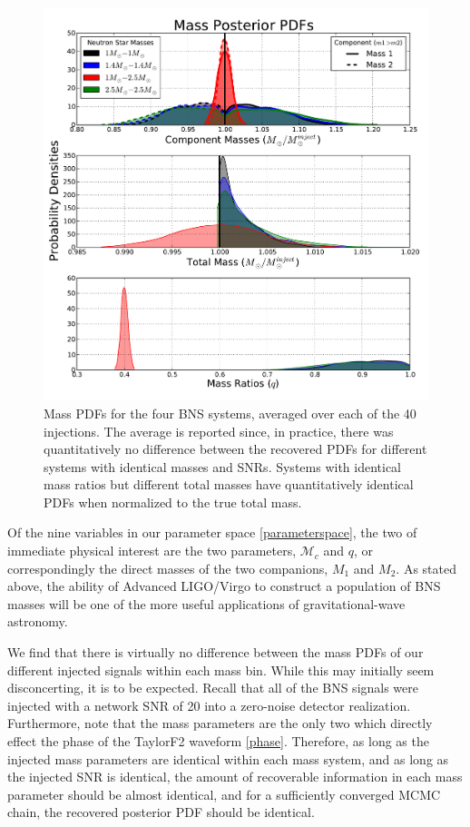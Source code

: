 \documentclass[11pt,a4paper]{emulateapj}
\newcommand{\chmass}{\mathcal{M}_c}
\begin{document}
\begin{figure}[ht!]
  \centering
 \includegraphics[trim=2cm 0cm 2cm 0cm, clip=false,scale=0.7]{newMasses.pdf}
 \caption{Mass PDFs for the four BNS systems, averaged over each of the 40 injections.  The average is reported since, in practice, there was quantitatively no difference between the recovered PDFs for different systems with identical masses and SNRs.  Systems with identical mass ratios but different total masses have quantitatively identical PDFs when normalized to the true total mass.}
  \label{metaMassPDFs}
\end{figure}

Of the nine variables in our parameter space \eqref{parameterspace}, the two of immediate physical
interest are the two parameters, $\chmass$ and $q$, or correspondingly the direct masses 
of the two companions, $M_1$ and $M_2$.    As stated above, the ability of
Advanced LIGO/Virgo to construct a population of BNS masses will be one of the more useful applications
of gravitational-wave astronomy.

We find that there is virtually no difference between the mass PDFs of our different injected signals
within each mass bin.  While this may initially seem disconcerting, it is to be expected.  Recall that all of the BNS signals were injected with a network SNR of 20 into a zero-noise detector realization.  Furthermore, note that the mass parameters are the only two which directly effect the phase of the TaylorF2 waveform \eqref{phase}.  Therefore, as long as the injected mass parameters are identical within each mass system, and as long as the injected SNR is identical, the amount of recoverable information in each mass parameter should be almost identical, and for a sufficiently converged MCMC chain, the recovered posterior PDF should be identical.  
\end{document}
